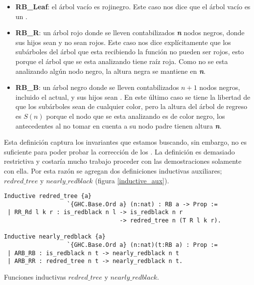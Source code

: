 \begin{itemize}
        \item \textbf{RB\_Leaf}: el árbol vac\'io es rojinegro. Este caso nos dice que el \'arbol
        vacío es un {\arn}.
        \item \textbf{RB\_R}: un árbol rojo donde se lleven contabilizados \textbf{\textit{n}} nodos 
        negros, donde sus hijos sean {\arns} y no sean rojos. Este caso nos dice explícitamente que 
        los subárboles del árbol que esta recibiendo la función no pueden ser rojos, esto porque el 
        árbol que se esta analizando tiene raíz roja. Como no se esta analizando algún nodo negro, 
        la altura negra se mantiene en \textbf{\textit{n}}.
        \item \textbf{RB\_B}: un árbol negro donde se lleven contabilizados $n+1$ nodos negros, 
        incluido el actual, y sus hijos sean {\arns}. En este \'ultimo caso se tiene la libertad de 
        que los subárboles sean de cualquier color, pero la altura del \'arbol de regreso es $S(n)$ 
        porque el nodo que se esta analizando es de color negro, los antecedentes al no tomar en 
        cuenta a su nodo padre tienen altura \textbf{\textit{n}}.
\end{itemize}

Esta definici\'on captura los invariantes que estamos buscando, sin embargo, no es suficiente para
poder probar la correcci\'on de los {\arns}. La definici\'on es demasiado restrictiva y costaría 
mucho trabajo proceder con las demostraciones solamente con ella. Por esta razón se agregan dos
definiciones inductivas auxiliares; \hyperref[inductive_isRedB]{$redred\_tree$} y 
\hyperref[inductive_isRedB]{$nearly\_redblack$} (figura \ref{inductive_aux}).

\begin{listing}[!ht]
\centering
\captionsetup{justification=centering}
\begin{verbatim}
Inductive redred_tree {a}
                  `{GHC.Base.Ord a} (n:nat) : RB a -> Prop :=
 | RR_Rd l k r : is_redblack n l -> is_redblack n r
                                 -> redred_tree n (T R l k r).

Inductive nearly_redblack {a}
                  `{GHC.Base.Ord a} (n:nat)(t:RB a) : Prop :=
 | ARB_RB : is_redblack n t -> nearly_redblack n t
 | ARB_RR : redred_tree n t -> nearly_redblack n t.
\end{verbatim}
\caption{Funciones inductivas \hyperref[inductive_isRedB]{$redred\_tree$} y 
\hyperref[inductive_isRedB]{$nearly\_redblack$}.}
\label{inductive_aux}
\end{listing}

